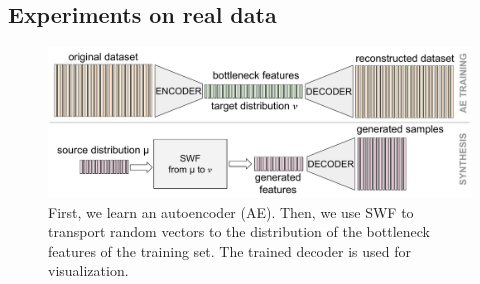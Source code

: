 \subsection{Experiments on real data}
\begin{figure}
\centering
\includegraphics[width=0.99\columnwidth]{figures/generating_bottleneck_features.pdf}
\caption{First, we learn an autoencoder (AE). Then, we use SWF to transport random vectors to the distribution of the bottleneck features of the training set. The trained decoder is used for visualization.}
\label{fig:using_ae}
\vspace{-10pt}
\end{figure}


